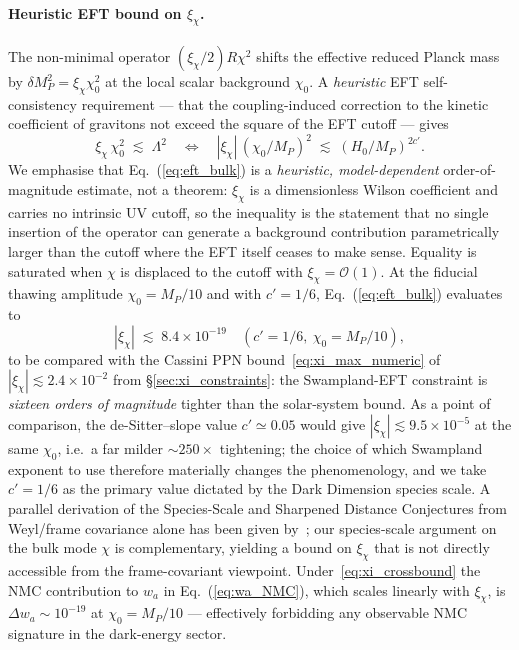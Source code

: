 \paragraph{Heuristic EFT bound on $\xi_\chi$.}
The non-minimal operator $(\xi_\chi/2)R\chi^2$ shifts the effective reduced
Planck mass by $\delta M_P^2 = \xi_\chi\chi_0^2$ at the local scalar
background $\chi_0$. A \emph{heuristic} EFT self-consistency requirement ---
that the coupling-induced correction to the kinetic coefficient of
gravitons not exceed the square of the EFT cutoff --- gives
\begin{equation}
  \xi_\chi\,\chi_0^{2}\;\lesssim\;\Lambda^{2}
  \quad\Longleftrightarrow\quad
  |\xi_\chi|\,(\chi_0/M_P)^{2}\;\lesssim\;(H_0/M_P)^{2c'}.
  \label{eq:eft_bulk}
\end{equation}
We emphasise that Eq.~(\ref{eq:eft_bulk}) is a \emph{heuristic, model-dependent}
order-of-magnitude estimate, not a theorem: $\xi_\chi$ is a dimensionless
Wilson coefficient and carries no intrinsic UV cutoff, so the inequality
is the statement that no single insertion of the operator can generate a
background contribution parametrically larger than the cutoff where the
EFT itself ceases to make sense. Equality is saturated when $\chi$ is
displaced to the cutoff with $\xi_\chi=\mathcal{O}(1)$.
At the fiducial thawing amplitude $\chi_0 = M_P/10$ and with
$c' = 1/6$, Eq.~(\ref{eq:eft_bulk}) evaluates to
\begin{equation}
  \boxed{\;|\xi_\chi|\;\lesssim\;8.4\times 10^{-19}
    \quad(c'=1/6,\ \chi_0=M_P/10),\;}
  \label{eq:xi_crossbound}
\end{equation}
to be compared with the Cassini PPN bound~\eqref{eq:xi_max_numeric} of
$|\xi_\chi|\lesssim 2.4\times 10^{-2}$ from \S\ref{sec:xi_constraints}:
the Swampland-EFT constraint is \emph{sixteen orders of magnitude} tighter
than the solar-system bound. As a point of comparison, the de-Sitter--slope
value $c'\simeq 0.05$ would give $|\xi_\chi|\lesssim 9.5\times 10^{-5}$ at
the same $\chi_0$, i.e.\ a far milder $\sim\!250\times$ tightening; the
choice of which Swampland exponent to use therefore materially changes the
phenomenology, and we take $c'=1/6$ as the primary value dictated by the
Dark Dimension species scale. A parallel derivation of the Species-Scale and
Sharpened Distance Conjectures from Weyl/frame covariance alone has been
given by~\cite{FrameCovariance2025}; our species-scale argument on the bulk
mode $\chi$ is complementary, yielding a bound on $\xi_\chi$ that is not
directly accessible from the frame-covariant viewpoint.
Under~\eqref{eq:xi_crossbound} the NMC contribution to $w_a$ in
Eq.~(\ref{eq:wa_NMC}), which scales linearly with $\xi_\chi$, is
$\Delta w_a \sim 10^{-19}$ at $\chi_0 = M_P/10$ --- effectively forbidding
any observable NMC signature in the dark-energy sector.

